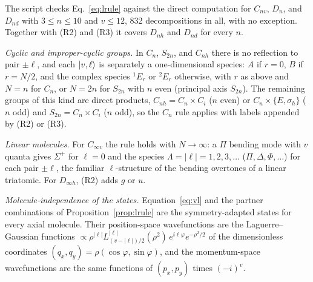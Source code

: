\documentclass[11pt]{article}
\begin{document}
The script checks Eq.~\eqref{eq:lrule} against the direct computation for $C_{nv}$, $D_n$, and $D_{nd}$ with $3\le n\le10$ and $v\le12$, 832 decompositions in all, with no exception. Together with (R2) and (R3) it covers $D_{nh}$ and $D_{nd}$ for every $n$.

\emph{Cyclic and improper-cyclic groups.} In $C_n$, $S_{2n}$, and $C_{nh}$ there is no reflection to pair $\pm\ell$, and each $\ket{v,\ell}$ is separately a one-dimensional species: $A$ if $r=0$, $B$ if $r=N/2$, and the complex species ${}^1E_r$ or ${}^2E_r$ otherwise, with $r$ as above and $N=n$ for $C_n$, or $N=2n$ for $S_{2n}$ with $n$ even (principal axis $S_{2n}$). The remaining groups of this kind are direct products, $C_{nh}=C_n\times C_i$ ($n$ even) or $C_n\times\{E,\sigma_h\}$ ($n$ odd) and $S_{2n}=C_n\times C_i$ ($n$ odd), so the $C_n$ rule applies with labels appended by (R2) or (R3).

\emph{Linear molecules.} For $C_{\infty v}$ the rule holds with $N\to\infty$: a $\Pi$ bending mode with $v$ quanta gives $\Sigma^+$ for $\ell=0$ and the species $\Lambda=|\ell|=1,2,3,\ldots$ ($\Pi,\Delta,\Phi,\ldots$) for each pair $\pm\ell$, the familiar $\ell$-structure of the bending overtones of a linear triatomic. For $D_{\infty h}$, (R2) adds $g$ or $u$.

\emph{Molecule-independence of the states.} Equation~\eqref{eq:vl} and the partner combinations of Proposition~\ref{prop:lrule} are the symmetry-adapted states for every axial molecule. Their position-space wavefunctions are the Laguerre--Gaussian functions $\propto\rho^{|\ell|}L^{|\ell|}_{(v-|\ell|)/2}(\rho^2)\,e^{i\ell\varphi}e^{-\rho^2/2}$ of the dimensionless coordinates $(q_x,q_y)=\rho(\cos\varphi,\sin\varphi)$, and the momentum-space wavefunctions are the same functions of $(p_x,p_y)$ times $(-i)^v$.
\end{document}

